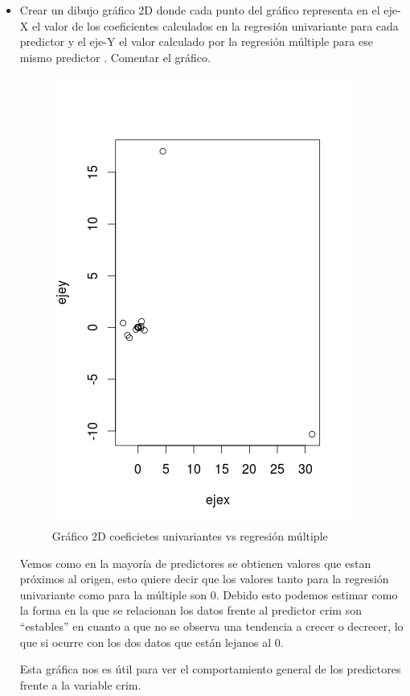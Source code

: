 \begin{itemize}

\item Crear un dibujo gráfico 2D donde cada punto del gráfico representa en el eje-X el valor de los coeficientes calculados en la regresión univariante para cada predictor y el eje-Y el valor calculado por la regresión múltiple para ese mismo predictor . Comentar el gráfico.

\begin{figure}[H]
\centering
\includegraphics[scale=.60]{ejeXY.png}
\caption{Gráfico 2D coeficietes univariantes vs regresión múltiple}
\label{}
\end{figure}

Vemos como en la mayoría de predictores se obtienen valores que estan próximos al origen, esto quiere decir que los valores tanto para la regresión univariante como para la múltiple son 0. Debido  esto podemos estimar como la forma en la que se relacionan los datos frente al predictor crim son ``estables'' en cuanto a que no se observa una tendencia a crecer o decrecer, lo que si ocurre con los dos datos que están lejanos al 0. 

Esta gráfica nos es útil para ver el comportamiento general de los predictores frente a la variable crim.

\end{itemize}

